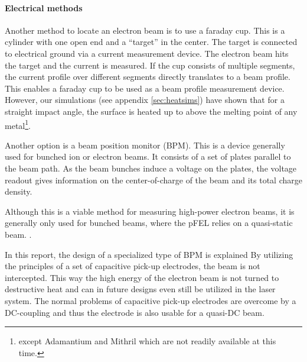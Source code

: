 \paragraph{Electrical methods}
Another method to locate an electron beam is to use a faraday cup. This is a cylinder with one open end and a ``target'' in the center. The target is connected to electrical ground via a current measurement device. 
The electron beam hits the target and the current is measured. If the cup consists of multiple segments, the current profile over different segments directly translates to a beam profile. 
This enables a faraday cup to be used as a beam profile measurement device.
However, our simulations (see appendix \ref{sec:heatsims}) have shown that for a straight impact angle, the surface is heated up to above the melting point of any metal\footnote{except Adamantium and Mithril which are not readily available at this time.}.

Another option is a beam position monitor (BPM). This is a device generally used for bunched ion or electron beams. It consists of a set of plates parallel to the beam path. As the beam bunches induce a voltage on the plates, the voltage readout gives information on the center-of-charge of the beam and its total charge density.

Although this is a viable method for measuring high-power electron beams, it is generally only used for bunched beams, where the pFEL relies on a quasi-static beam. .

In this report, the design of a specialized type of BPM is explained
By utilizing the principles of a set of capacitive pick-up electrodes, the beam is not intercepted. This way the high energy of the electron beam is not turned to destructive heat and can in future designs even still be utilized in the laser system.
The normal problems of capacitive pick-up electrodes are overcome by a DC-coupling and thus the electrode is also usable for a quasi-DC beam. 


